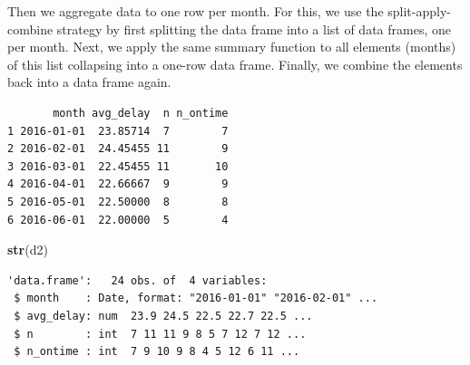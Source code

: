 \documentclass[
]{book}
\newenvironment{Shaded}{\begin{snugshade}}{\end{snugshade}}
\newcommand{\AttributeTok}[1]{\textcolor[rgb]{0.13,0.29,0.53}{#1}}
\newcommand{\CommentTok}[1]{\textcolor[rgb]{0.56,0.35,0.01}{\textit{#1}}}
\newcommand{\ConstantTok}[1]{\textcolor[rgb]{0.56,0.35,0.01}{#1}}
\newcommand{\ControlFlowTok}[1]{\textcolor[rgb]{0.13,0.29,0.53}{\textbf{#1}}}
\newcommand{\DecValTok}[1]{\textcolor[rgb]{0.00,0.00,0.81}{#1}}
\newcommand{\FunctionTok}[1]{\textcolor[rgb]{0.13,0.29,0.53}{\textbf{#1}}}
\newcommand{\NormalTok}[1]{#1}
\newcommand{\OtherTok}[1]{\textcolor[rgb]{0.56,0.35,0.01}{#1}}
\newcommand{\SpecialCharTok}[1]{\textcolor[rgb]{0.81,0.36,0.00}{\textbf{#1}}}
\begin{document}
Then we aggregate data to one row per month. For this, we use the split-apply-combine strategy by first splitting the data frame into a list of data frames, one per month. Next, we apply the same summary function to all elements (months) of this list collapsing into a one-row data frame. Finally, we combine the elements back into a data frame again.

\begin{Shaded}
\end{Shaded}

\begin{verbatim}
       month avg_delay  n n_ontime
1 2016-01-01  23.85714  7        7
2 2016-02-01  24.45455 11        9
3 2016-03-01  22.45455 11       10
4 2016-04-01  22.66667  9        9
5 2016-05-01  22.50000  8        8
6 2016-06-01  22.00000  5        4
\end{verbatim}

\begin{Shaded}
\begin{Highlighting}[]
\FunctionTok{str}\NormalTok{(d2)}
\end{Highlighting}
\end{Shaded}

\begin{verbatim}
'data.frame':   24 obs. of  4 variables:
 $ month    : Date, format: "2016-01-01" "2016-02-01" ...
 $ avg_delay: num  23.9 24.5 22.5 22.7 22.5 ...
 $ n        : int  7 11 11 9 8 5 7 12 7 12 ...
 $ n_ontime : int  7 9 10 9 8 4 5 12 6 11 ...
\end{verbatim}
\end{document}
